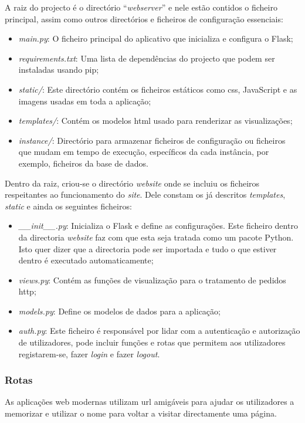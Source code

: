 A raiz do projecto é o directório ``\textit{webserver}'' e nele estão contidos o ficheiro principal, assim como outros directórios e ficheiros de configuração essenciais:
\begin{itemize}
	\item \textit{main.py}: O ficheiro principal do aplicativo que inicializa e configura o Flask;
	\item \textit{requirements.txt}: Uma lista de dependências do projecto que podem ser instaladas usando \gls{pip};
	\item \textit{static/}: Este directório contém os ficheiros estáticos como \acrshort{css}, JavaScript e as imagens usadas em toda a aplicação;
	\item \textit{templates/}: Contém os modelos \acrshort{html} usado para renderizar as visualizações;
	\item \textit{instance/}: Directório para armazenar ficheiros de configuração ou ficheiros que mudam em tempo de execução, específicos da cada instância, por exemplo, ficheiros da base de dados.
\end{itemize}

Dentro da raiz, criou-se o directório \textit{website} onde se incluiu os ficheiros respeitantes ao funcionamento do \textit{site}. Dele constam os já descritos \textit{templates}, \textit{static} e ainda os seguintes ficheiros:

\begin{itemize}
	\item \textit{\_\_init\_\_.py}: Inicializa o Flask e define as configurações. Este ficheiro dentro da directoria \textit{website} faz com que esta seja tratada como um pacote Python. Isto quer dizer que a directoria pode ser importada e tudo o que estiver dentro é executado automaticamente;
	\item \textit{views.py}: Contém as funções de visualização para o tratamento de pedidos \acrfull{http};
	\item \textit{models.py}: Define os modelos de dados para a aplicação;
	\item \textit{auth.py}: Este ficheiro é responsável por lidar com a autenticação e autorização de utilizadores, pode incluir funções e rotas que permitem aos utilizadores registarem-se, fazer \textit{login} e fazer \textit{logout}.
\end{itemize}

\subsubsection{Rotas}
As aplicações web modernas utilizam \acrshort{url} amigáveis para ajudar os utilizadores a memorizar e utilizar o nome para voltar a visitar directamente uma página.

